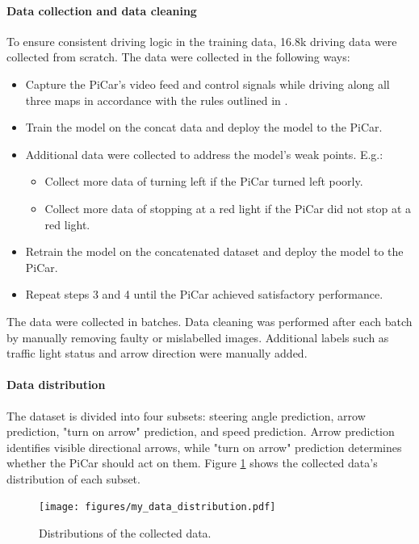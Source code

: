 \documentclass{article}
\begin{document}
\paragraph{Data collection and data cleaning}
To ensure consistent driving logic in the training data, 16.8k driving data were collected from scratch. The data were collected in the following ways:
\begin{itemize}
  \item Capture the PiCar's video feed and control signals while driving along all three maps in accordance with the rules outlined in \citep{Kaggle}.
  \item Train the model on the concat data and deploy the model to the PiCar.
  \item Additional data were collected to address the model's weak points. E.g.:
        \begin{itemize}
          \item Collect more data of turning left if the PiCar turned left poorly.
          \item Collect more data of stopping at a red light if the PiCar did not stop at a red light.
        \end{itemize}
  \item Retrain the model on the concatenated dataset and deploy the model to the PiCar.
  \item Repeat steps 3 and 4 until the PiCar achieved satisfactory performance.
\end{itemize}

The data were collected in batches. Data cleaning was performed after each batch by manually removing faulty or mislabelled images. Additional labels such as traffic light status and arrow direction were manually added. 

\paragraph{Data distribution}
The dataset is divided into four subsets: steering angle prediction, arrow prediction, "turn on arrow" prediction, and speed prediction. Arrow prediction identifies visible directional arrows, while "turn on arrow" prediction determines whether the PiCar should act on them. Figure \ref{fig:my_data_distribution} shows the collected data's distribution of each subset.

\begin{figure}[h]
  \centering
  \texttt{[image: figures/my\_data\_distribution.pdf]}
  \caption{Distributions of the collected data.}
  \label{fig:my_data_distribution}
\end{figure}
\end{document}
